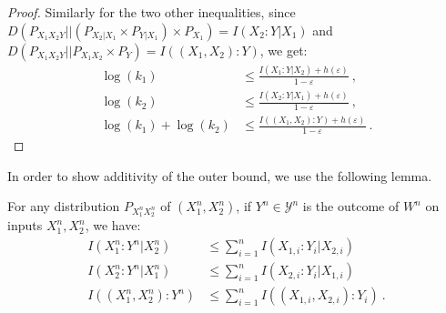 \begin{proof}
    Similarly for the two other inequalities, since $D\left(P_{X_1X_2Y}||\left(P_{X_2|X_1} \times P_{Y|X_1} \right) \times P_{X_1}\right) = I(X_2:Y|X_1)$ and $D\left(P_{X_1X_2Y}||P_{X_1X_2} \times P_Y \right) =  I((X_1,X_2):Y)$, we get:
    \begin{equation}
      \begin{aligned}
        \log(k_1) &\leq \frac{I(X_1:Y|X_2)+h(\varepsilon)}{1-\varepsilon} \ ,\\
        \log(k_2) &\leq \frac{I(X_2:Y|X_1)+h(\varepsilon)}{1-\varepsilon} \ ,\\
        \log(k_1)+\log(k_2) &\leq \frac{I((X_1,X_2):Y)+h(\varepsilon)}{1-\varepsilon} \ .
      \end{aligned}
    \end{equation}
  \end{proof}

In order to show additivity of the outer bound, we use the following lemma.

  \begin{lemma}
    \label{lem:multiletterOB}
     For any distribution $P_{X_1^nX_2^n}$ of $(X_1^n,X_2^n)$, if $Y^n \in \mathcal{Y}^n$ is the outcome of $W^n$ on inputs $X_1^n,X_2^n$, we have:
      \begin{equation}
        \begin{aligned}
          I(X_1^n:Y^n|X_2^n) &\leq \sum_{i=1}^n I(X_{1,i}:Y_i|X_{2,i})\\
          I(X_2^n:Y^n|X_1^n) &\leq \sum_{i=1}^n I(X_{2,i}:Y_i|X_{1,i})\\
          I((X_1^n,X_2^n):Y^n) &\leq \sum_{i=1}^n I((X_{1,i},X_{2,i}):Y_i) \ .
        \end{aligned}
      \end{equation}
  \end{lemma}
  
